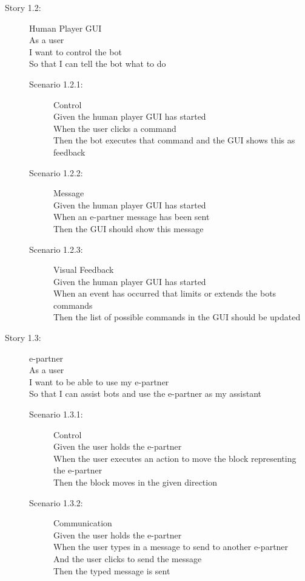 \begin{description}
	\item[Story 1.2:] Human Player GUI\\
	As a user \\
	I want to control the bot\\
	So that I can tell the bot what to do

	\begin{description}
		\item[Scenario 1.2.1:] Control\\
		Given the human player GUI has started\\
		When the user clicks a command\\
		Then the bot executes that command and the GUI shows this as feedback

		\item[Scenario 1.2.2:] Message\\
		Given the human player GUI has started\\
		When an \gls{e-partner} message has been sent\\
		Then the GUI should show this message

		\item[Scenario 1.2.3:] Visual Feedback\\
		Given the human player GUI has started\\
		When an event has occurred that limits or extends the bots commands\\
		Then the list of possible commands in the GUI should be updated
		\end{description}
	\end{description}

\begin{description}
	\item[Story 1.3:] \gls{e-partner}\\
	As a user\\
	I want to be able to use my \gls{e-partner}\\
	So that I can assist bots and use the \gls{e-partner} as my assistant

	\begin{description}
		\item[Scenario 1.3.1:] Control\\
		Given the user holds the \gls{e-partner}\\
		When the user executes an action to move the block representing the \gls{e-partner}\\
		Then the block moves in the given direction
		
		\item[Scenario 1.3.2:] Communication\\
		Given the user holds the \gls{e-partner}\\
		When the user types in a message to send to another \gls{e-partner}\\
		And the user clicks to send the message\\
		Then the typed message is sent
	\end{description}
\end{description}

